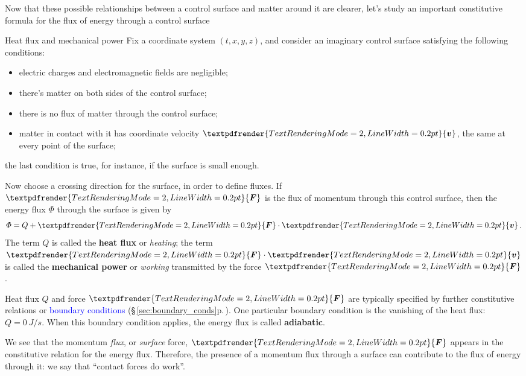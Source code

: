 \documentclass[a4paper,12pt,%
onecolumn,oneside,%
british%
]{memoir}
\renewcommand*{\bm}[1]{\textpdfrender{TextRenderingMode=2,LineWidth=0.2pt}{\boldsymbol{#1}}}
\renewcommand*{\|}[1][]{\nonscript\:#1\vert\nonscript\:\mathopen{}}
\newcommand*{\sect}{\S}%
\renewcommand*{\autoref}[3][\sect\,\ref]{\textcolor{blue}{#3} {\color{blue}\scriptsize(\faIcon[regular]{eye}\;#1{#2}\;p.\,\pageref{#2})}}
\newcommand*{\yv}{\bm{v}}
\newcommand*{\yH}{\varPhi}%
\newcommand*{\yQ}{Q}%
\newcommand*{\yF}{\bm{F}}
\begin{document}
Now that these possible relationships between a control surface and matter around it are clearer, let's study an important constitutive formula for the flux of energy through a control surface
\begin{definition}{Heat flux and mechanical power}\label{def:heatflux_mechpower}
  Fix a coordinate system $(t,x,y,z)$, and consider an imaginary control surface satisfying the following conditions:
\begin{itemize}[noitemsep]
\item electric charges and electromagnetic fields are negligible;
\item there's matter on both sides of the control surface;
\item there is no flux of matter through the control surface;
\item matter in contact with it has coordinate velocity $\yv$, the same at every point of the surface;
\end{itemize}
the last condition is true, for instance, if the surface is small enough.

  \smallskip

  Now choose a crossing direction for the surface, in order to define fluxes. If $\yF$ is the flux of momentum through this control surface, then the energy flux $\yH$ through the surface is given by
\begin{equation}
  \label{eq:heat_power}
  \yH = \yQ + \yF\cdot \yv \,.
\end{equation}
The term $\yQ$ is called the \textbf{heat flux} or \emph{heating}; the  term $\yF\cdot \yv$ is called the \textbf{mechanical power} or \emph{working} transmitted by the force $\yF$.

\smallskip

Heat flux $\yQ$ and force $\yF$ are typically specified by further constitutive relations or \autoref{sec:boundary_conds}{boundary conditions}. One particular boundary condition is the vanishing of the heat flux: $\yQ=\qty{0}{J/s}$. When this boundary condition applies, the energy flux is called \textbf{adiabatic}.
\end{definition}

We see that the momentum \emph{flux}, or \emph{surface} force, $\yF$ appears in the constitutive relation for the energy flux. Therefore, the presence of a momentum flux through a surface can contribute to the flux of energy through it: we say that \enquote{contact forces do work}.
\end{document}
